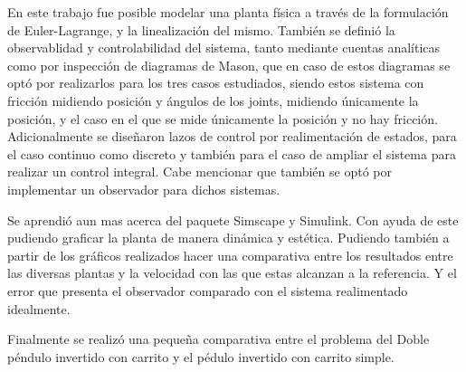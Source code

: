 %
%

En este trabajo fue posible modelar una planta física a través de la formulación de Euler-Lagrange, y la linealización del mismo. También se definió la observablidad y controlabilidad del sistema, tanto mediante cuentas analíticas como por inspección de diagramas de Mason, que en caso de estos diagramas se optó por realizarlos para los tres casos estudiados, siendo estos sistema con fricción midiendo posición y ángulos de los joints, midiendo únicamente la posición, y el caso en el que se mide únicamente la posición y no hay fricción.
Adicionalmente se diseñaron lazos de control por realimentación de estados, para el caso continuo como discreto y también para el caso de ampliar el sistema para realizar un control integral. Cabe mencionar que también se optó por implementar un observador para dichos sistemas.



Se aprendió aun mas acerca del paquete Simscape y Simulink. Con ayuda de este pudiendo graficar la planta de manera dinámica y estética. Pudiendo también a partir de los gráficos realizados hacer una comparativa entre los resultados entre las diversas plantas y la velocidad con las que estas alcanzan a la referencia. Y el error que presenta el observador comparado con el sistema realimentado idealmente.

Finalmente se realizó una pequeña comparativa entre el problema del Doble péndulo invertido con carrito y el pédulo invertido con carrito simple.
%